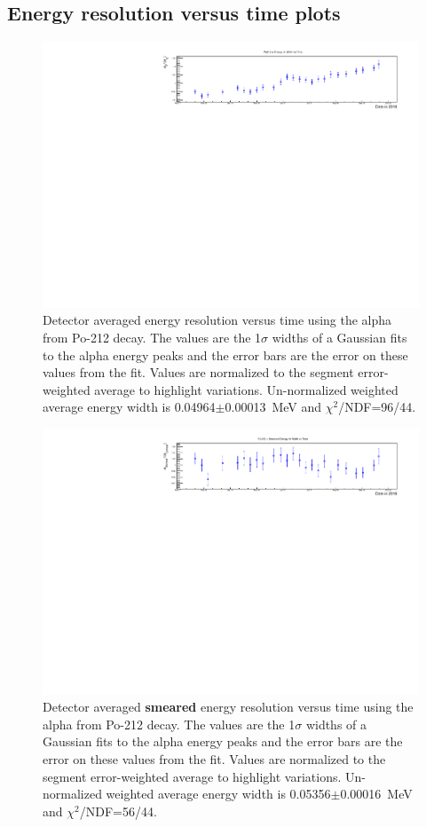 \subsection{Energy resolution versus time plots}
\begin{figure}[!h]
\centering
\includegraphics[width=1.05\textwidth]{figures/PubBiPo212EresvsT.pdf}
\caption{\label{fig:EresvsT212}Detector averaged energy resolution versus time using the alpha from Po-212 decay. The values are the 1$\sigma$ widths of a Gaussian fits to the alpha energy peaks and the error bars are the error on these values from the fit. Values are normalized to the segment error-weighted average to highlight variations. Un-normalized weighted average energy width is 0.04964$\pm$0.00013~MeV and $\chi^2$/NDF=96/44.}
\end{figure}
\begin{figure}[!h]
\centering
\includegraphics[width=1.05\textwidth]{figures/PubBiPo212EsmearresvsT.pdf}
\caption{\label{fig:EsmearresvsT212}Detector averaged {\bf smeared} energy resolution versus time using the alpha from Po-212 decay. The values are the 1$\sigma$ widths of a Gaussian fits to the alpha energy peaks and the error bars are the error on these values from the fit. Values are normalized to the segment error-weighted average to highlight variations. Un-normalized weighted average energy width is 0.05356$\pm$0.00016~MeV and $\chi^2$/NDF=56/44.}
\end{figure}
